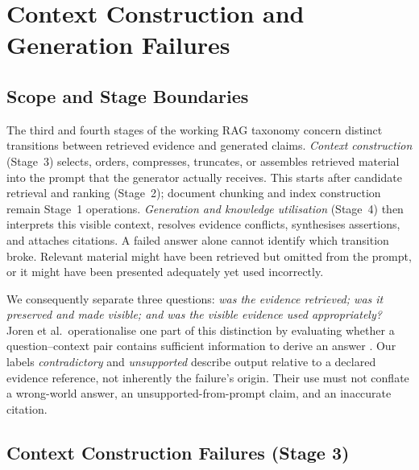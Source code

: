 \section{Context Construction and Generation Failures}
\label{sec:context-generation}

\subsection{Scope and Stage Boundaries}
\label{subsec:section6-boundaries}

The third and fourth stages of the working RAG taxonomy concern distinct transitions between retrieved evidence and generated claims. \emph{Context construction} (Stage~3) selects, orders, compresses, truncates, or assembles retrieved material into the prompt that the generator actually receives. This starts after candidate retrieval and ranking (Stage~2); document chunking and index construction remain Stage~1 operations. \emph{Generation and knowledge utilisation} (Stage~4) then interprets this visible context, resolves evidence conflicts, synthesises assertions, and attaches citations. A failed answer alone cannot identify which transition broke. Relevant material might have been retrieved but omitted from the prompt, or it might have been presented adequately yet used incorrectly.

We consequently separate three questions: \emph{was the evidence retrieved; was it preserved and made visible; and was the visible evidence used appropriately?} Joren et al.\ operationalise one part of this distinction by evaluating whether a question--context pair contains sufficient information to derive an answer \cite[Secs.~3--4]{joren2025sufficient}. Our labels \emph{contradictory} and \emph{unsupported} describe output relative to a declared evidence reference, not inherently the failure's origin. Their use must not conflate a wrong-world answer, an unsupported-from-prompt claim, and an inaccurate citation.

\subsection{Context Construction Failures (Stage 3)}
\label{subsec:section6-context}

